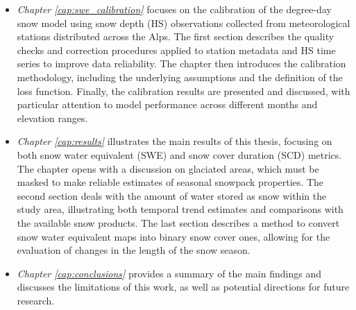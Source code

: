 \begin{itemize}[label=$\blacktriangleright$]
    \item \textit{Chapter \ref{cap:swe_calibration}} focuses on the calibration of the degree-day snow model using snow depth (HS) observations 
    collected from meteorological stations distributed across the Alps. The first section describes the quality checks and correction 
    procedures applied to station metadata and HS time series to improve data reliability. The chapter then introduces the calibration methodology, 
    including the underlying assumptions and the definition of the loss function. Finally, the calibration results are presented and discussed, with 
    particular attention to model performance across different months and elevation ranges.
    \item \textit{Chapter \ref{cap:results}} illustrates the main results of this thesis, focusing on both snow water equivalent (SWE) and snow 
    cover duration (SCD) metrics. The chapter opens with a discussion on glaciated areas, which must be masked to make reliable estimates 
    of seasonal snowpack properties. The second section deals with the amount of water stored as snow within the study area, illustrating both temporal 
    trend estimates and comparisons with the available snow products. The last section describes a method to convert snow water equivalent maps into 
    binary snow cover ones, allowing for the evaluation of changes in the length of the snow season.
    \item \textit{Chapter \ref{cap:conclusions}} provides a summary of the main findings and discusses the limitations of this work, as well as 
    potential directions for future research.  
\end{itemize}